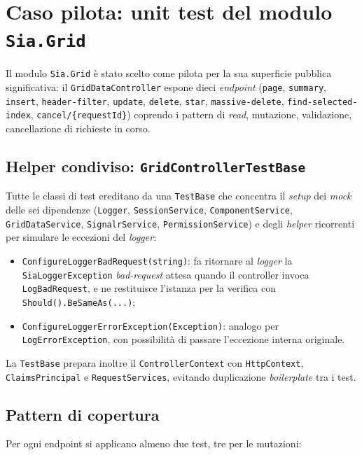 \section{Caso pilota: unit test del modulo \texttt{Sia.Grid}}

Il modulo \texttt{Sia.Grid} è stato scelto come pilota per la sua superficie pubblica significativa: il \texttt{GridDataController} espone dieci \emph{endpoint} (\texttt{page}, \texttt{summary}, \texttt{insert}, \texttt{header-filter}, \texttt{update}, \texttt{delete}, \texttt{star}, \texttt{massive-delete}, \texttt{find-selected-index}, \texttt{cancel/\{requestId\}}) coprendo i pattern di \emph{read}, mutazione, validazione, cancellazione di richieste in corso.

\subsection{Helper condiviso: \texttt{GridControllerTestBase}}

Tutte le classi di test ereditano da una \texttt{TestBase} che concentra il \emph{setup} dei \emph{mock} delle sei dipendenze (\texttt{Logger}, \texttt{SessionService}, \texttt{ComponentService}, \texttt{GridDataService}, \texttt{SignalrService}, \texttt{PermissionService}) e degli \emph{helper} ricorrenti per simulare le eccezioni del \emph{logger}:
\begin{itemize}
    \item \texttt{ConfigureLoggerBadRequest(string)}: fa ritornare al \emph{logger} la \texttt{SiaLoggerException} \emph{bad-request} attesa quando il controller invoca \texttt{LogBadRequest}, e ne restituisce l'istanza per la verifica con \texttt{Should().BeSameAs(...)};
    \item \texttt{ConfigureLoggerErrorException(Exception)}: analogo per \texttt{LogErrorException}, con possibilità di passare l'eccezione interna originale.
\end{itemize}
La \texttt{TestBase} prepara inoltre il \texttt{ControllerContext} con \texttt{HttpContext}, \texttt{ClaimsPrincipal} e \texttt{RequestServices}, evitando duplicazione \emph{boilerplate} tra i test.

\subsection{Pattern di copertura}

Per ogni endpoint si applicano almeno due test, tre per le mutazioni:

